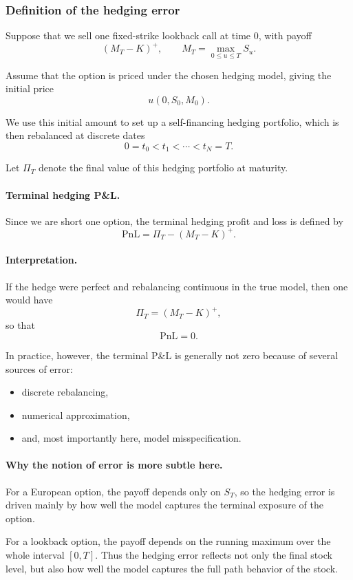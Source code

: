 \documentclass[11pt]{article}
\theoremstyle{plain}
\theoremstyle{definition}
\theoremstyle{remark}
\begin{document}
\subsubsection{Definition of the hedging error}

Suppose that we sell one fixed-strike lookback call at time \(0\), with
payoff
\[
(M_T-K)^+,
\qquad
M_T=\max_{0\le u\le T}S_u.
\]

Assume that the option is priced under the chosen hedging model, giving
the initial price
\[
u(0,S_0,M_0).
\]

We use this initial amount to set up a self-financing hedging
portfolio, which is then rebalanced at discrete dates
\[
0=t_0<t_1<\cdots<t_N=T.
\]

Let \(\Pi_T\) denote the final value of this hedging portfolio at
maturity.

\paragraph{Terminal hedging P\&L.}
Since we are short one option, the terminal hedging profit and loss is
defined by
\[
\boxed{
\mathrm{PnL}
=
\Pi_T-(M_T-K)^+.
}
\]

\paragraph{Interpretation.}
If the hedge were perfect and rebalancing continuous in the true model,
then one would have
\[
\Pi_T=(M_T-K)^+,
\]
so that
\[
\mathrm{PnL}=0.
\]

In practice, however, the terminal P\&L is generally not zero because of
several sources of error:
\begin{itemize}[leftmargin=1.4em]
    \item discrete rebalancing,
    \item numerical approximation,
    \item and, most importantly here, model misspecification.
\end{itemize}

\paragraph{Why the notion of error is more subtle here.}
For a European option, the payoff depends only on \(S_T\), so the
hedging error is driven mainly by how well the model captures the
terminal exposure of the option.

For a lookback option, the payoff depends on the running maximum over
the whole interval \([0,T]\).
Thus the hedging error reflects not only the final stock level, but also
how well the model captures the full path behavior of the stock.
\end{document}
